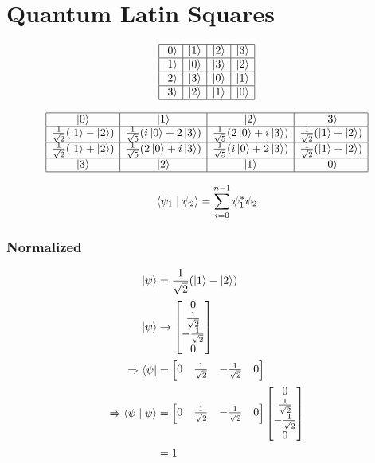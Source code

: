 \chapter{Quantum Latin Squares}


$$
\begin{array}{|c|c|c|c|}
  \hline
  \ket{0} & \ket{1} & \ket{2} & \ket{3} \\
  \hline
  \ket{1} & \ket{0} & \ket{3} & \ket{2} \\
  \hline
  \ket{2} & \ket{3} & \ket{0} & \ket{1} \\
  \hline
  \ket{3} & \ket{2} & \ket{1} & \ket{0} \\
  \hline
\end{array}
$$


$$
\begin{array}{|c|c|c|c|}
  \hline
  \ket{0} & \ket{1} & \ket{2} & \ket{3} \\
  \hline
  \frac{1}{\sqrt{2}}(\ket{1}-\ket{2}) & \frac{1}{\sqrt{5}}(i\ket{0}+2\ket{3}) & \frac{1}{\sqrt{5}}(2\ket{0}+i\ket{3}) & \frac{1}{\sqrt{2}}(\ket{1}+\ket{2}) \\
  \hline
  \frac{1}{\sqrt{2}}(\ket{1}+\ket{2}) & \frac{1}{\sqrt{5}}(2\ket{0}+i\ket{3}) & \frac{1}{\sqrt{5}}(i\ket{0}+2\ket{3}) & \frac{1}{\sqrt{2}}(\ket{1}-\ket{2}) \\
  \hline
  \ket{3} & \ket{2} & \ket{1} & \ket{0} \\
  \hline
\end{array}
$$ 


$$
\braket{\psi_1 \mid \psi_2} = \sum_{i=0}^{n-1} \psi_1^* \psi_2
$$

\subsection{Normalized}

\begin{align}
\ket{\psi} &= \frac{1}{\sqrt{2}}(\ket{1}-\ket{2}) \\
\ket{\psi} &\rightarrow \begin{bmatrix} 0 \\ \frac{1}{\sqrt{2}} \\ -\frac{1}{\sqrt{2}} \\ 0 \end{bmatrix} \\
\Rightarrow \bra{\psi} &= \begin{bmatrix} 0 & \frac{1}{\sqrt{2}} & -\frac{1}{\sqrt{2}} & 0 \end{bmatrix} \\
\Rightarrow \braket{\psi \mid \psi} &= \begin{bmatrix} 0 & \frac{1}{\sqrt{2}} & -\frac{1}{\sqrt{2}} & 0 \end{bmatrix} \begin{bmatrix} 0 \\ \frac{1}{\sqrt{2}} \\ -\frac{1}{\sqrt{2}} \\ 0 \end{bmatrix} \\
&= 1
\end{align}



